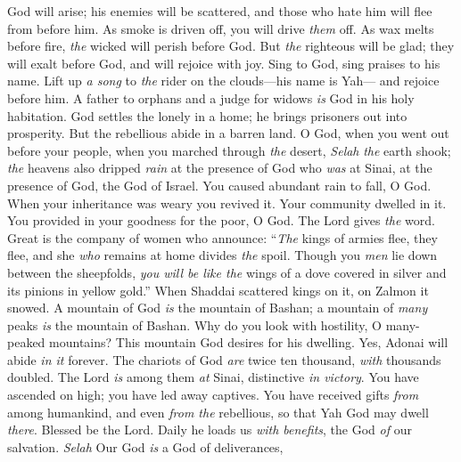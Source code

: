 \begin{biblechapter} %
 God will arise; his enemies will be scattered, 
and those who hate him will flee from before him.
\verse As smoke is driven off, you will drive \textit{them} off. 
As wax melts before fire, 
\textit{the} wicked will perish before God.
\verse But \textit{the} righteous will be glad; they will exalt before God, 
and will rejoice with joy.
\verse Sing to God, sing praises to his name. 
Lift up \textit{a song} to \textit{the} rider on the clouds—his name is Yah— 
and rejoice before him.
\verse A father to orphans and a judge for widows 
\textit{is} God in his holy habitation.
\verse God settles the lonely in a home; 
he brings prisoners out into prosperity. 
But the rebellious abide in a barren land.
\verse O God, when you went out before your people, 
when you marched through \textit{the} desert, \textit{Selah}
\verse \textit{the} earth shook; \textit{the} heavens also dripped \textit{rain} 
at the presence of God who \textit{was} at Sinai, 
at the presence of God, the God of Israel.
\verse You caused abundant rain to fall, O God. 
When your inheritance was weary you revived it.
\verse Your community dwelled in it. 
You provided in your goodness for the poor, O God.
\verse The Lord gives \textit{the} word. 
Great is the company of women who announce:
\verse “\textit{The} kings of armies flee, they flee, 
and she \textit{who} remains at home divides \textit{the} spoil.
\verse Though you \textit{men} lie down between the sheepfolds, 
\textit{you will be like the} wings of a dove covered in silver 
and its pinions in yellow gold.”
\verse When Shaddai scattered kings on it, 
on Zalmon it snowed.
\verse A mountain of God \textit{is} the mountain of Bashan; 
a mountain of \textit{many} peaks \textit{is} the mountain of Bashan.
\verse Why do you look with hostility, O many-peaked mountains? 
This mountain God desires for his dwelling. 
Yes, Adonai will abide \textit{in it} forever.
\verse The chariots of God 
\textit{are} twice ten thousand, \textit{with} thousands doubled. 
The Lord \textit{is} among them \textit{at} Sinai, distinctive \textit{in victory}.
\verse You have ascended on high; you have led away captives. 
You have received gifts \textit{from} among humankind, 
and even \textit{from the} rebellious, so that Yah God may dwell \textit{there}.
\verse Blessed be the Lord. Daily he loads us \textit{with benefits}, 
the God \textit{of} our salvation. \textit{Selah}
\verse Our God \textit{is} a God of deliverances, 

\end{biblechapter}
